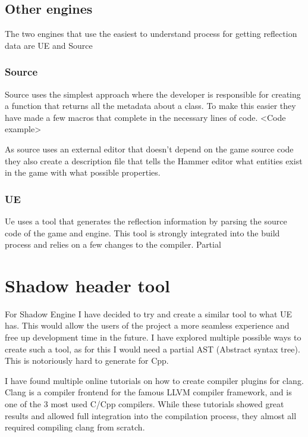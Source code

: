 \subsection{Other engines}

The two engines that use the easiest to understand process for getting reflection data are UE and Source

\subsubsection{Source}
Source uses the simplest approach where the developer is responsible for creating a function that returns all the metadata about a class.
To make this easier they have made a few macros that complete in the necessary lines of code.
<Code example>

As source uses an external editor that doesn't depend on the game source code they also create a description file that tells the Hammer editor what entities exist in the game with what possible properties.

\subsubsection{UE}

Ue uses a tool that generates the reflection information by parsing the source code of the game and engine.
This tool is strongly integrated into the build process and relies on a few changes to the compiler.
Partial


\section{Shadow header tool}\label{sec:shadow-header-tool}

For Shadow Engine I have decided to try and create a similar tool to what UE has.
This would allow the users of the project a more seamless experience and free up development time in the future.
I have explored multiple possible ways to create such a tool, as for this I would need a partial AST (Abstract syntax tree).
This is notoriously hard to generate for Cpp.

I have found multiple online tutorials on how to create compiler plugins for clang.
Clang is a compiler frontend for the famous LLVM compiler framework, and is one of the 3 most used C/Cpp compilers.
While these tutorials showed great results and allowed full integration into the compilation process, they almost all required compiling clang from scratch.

